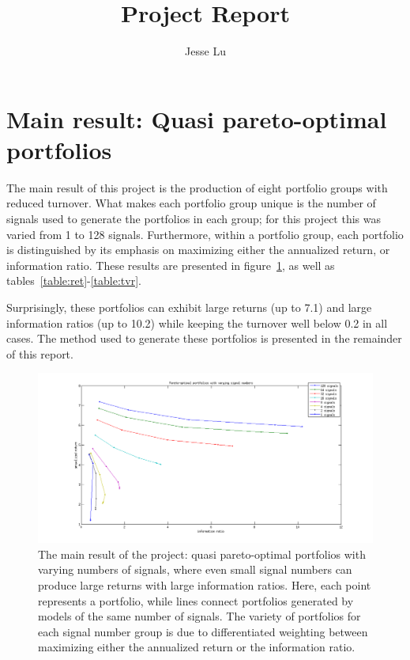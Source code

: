 \documentclass{article}
\title{Project Report}
\author{Jesse Lu}
\begin{document}
\maketitle
\tableofcontents

\section{Main result: Quasi pareto-optimal portfolios}

    The main result of this project is the production of 
        eight portfolio groups with reduced turnover.
    What makes each portfolio group unique is the number of signals
        used to generate the portfolios in each group;
        for this project this was varied from 1 to 128 signals.
    Furthermore, within a portfolio group, 
        each portfolio is distinguished by its emphasis on maximizing
        either the annualized return, or information ratio.
    These results are presented in figure~\ref{result},
        as well as tables~\ref{table:ret}-\ref{table:tvr}.

    Surprisingly, these portfolios can exhibit large returns (up to 7.1)
        and large information ratios (up to 10.2)
        while keeping the turnover well below 0.2 in all cases.
    The method used to generate these portfolios is presented in
        the remainder of this report.

    \begin{figure}[t]
        \centerline{\includegraphics[width=1.8\textwidth]{result.png}}
        \caption{The main result of the project: 
                quasi pareto-optimal portfolios with varying numbers of signals,
                where even small signal numbers can produce large returns
                with large information ratios.
            Here, each point represents a portfolio, 
                while lines connect portfolios 
                generated by models of the same number of signals.
            The variety of portfolios for each signal number group
                is due to differentiated weighting between maximizing
                either the annualized return or the information ratio.
            }
        \label{result}
    \end{figure}
    \clearpage
\end{document}
